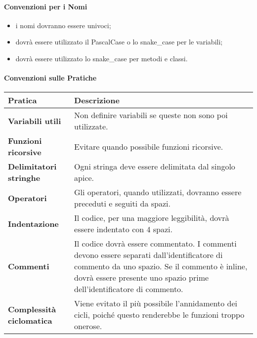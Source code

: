     \paragraph{Convenzioni per i Nomi} 
    \begin{itemize}
        \item i nomi dovranno essere univoci;
        \item dovrà essere utilizzato il PascalCase o lo snake\_case per le variabili;
        \item dovrà essere utilizzato lo snake\_case per metodi e classi. 
    \end{itemize}
        
    \paragraph{Convenzioni sulle Pratiche} \hfill \break
\newline
    \begin{tabular}{ |m{15em}|m{25em}| }
        \hline
        \textbf{Pratica}			    & \textbf{Descrizione}\\
        \hline
        \textbf{Variabili utili}		& Non definire variabili se queste non sono poi utilizzate.\\
        \hline
        \textbf{Funzioni ricorsive}		& Evitare quando possibile funzioni ricorsive.\\
        \hline
        \textbf{Delimitatori stringhe}	& Ogni stringa deve essere delimitata dal singolo apice.\\
        \hline
        \textbf{Operatori}			    & Gli operatori, quando utilizzati, dovranno essere preceduti e seguiti da spazi.\\
        \hline
        \textbf{Indentazione}			& Il codice, per una maggiore leggibilità, dovrà essere indentato con 4 spazi.\\ %
        \hline
        \textbf{Commenti}			    & Il codice dovrà essere commentato. I commenti devono essere separati dall'identificatore di commento da uno spazio. Se il commento è inline, dovrà essere presente uno spazio prime dell'identificatore di commento.\\
        \hline
        \textbf{Complessità ciclomatica}& Viene evitato il più possibile l'annidamento dei cicli, poiché questo renderebbe le funzioni troppo onerose.\\
        \hline
\end{tabular}
    
